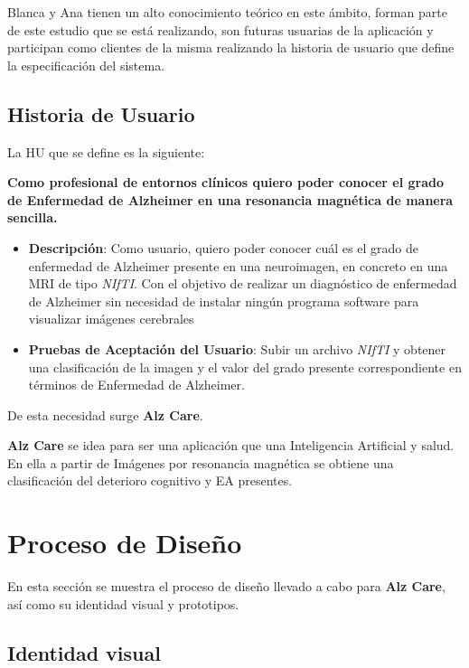 Blanca y Ana tienen un alto conocimiento teórico en este ámbito, forman parte de este estudio que se está realizando,
son futuras usuarias de la aplicación y participan como clientes de la misma realizando la historia de usuario que
define la especificación del sistema.

\subsection{Historia de Usuario}\label{subsec:historia-de-usuario}
La HU que se define es la siguiente:

\textbf{Como profesional de entornos clínicos quiero poder conocer el grado de Enfermedad de Alzheimer en una resonancia
magnética de manera sencilla.}

\begin{itemize}
    \item \textbf{Descripción}: Como usuario, quiero poder conocer cuál es el grado de enfermedad de Alzheimer presente
    en una neuroimagen, en concreto en una MRI de tipo \textit{NIfTI}.
    Con el objetivo de realizar un diagnóstico de enfermedad de Alzheimer sin necesidad de instalar ningún programa
    software para visualizar imágenes cerebrales
    \item \textbf{Pruebas de Aceptación del Usuario}: Subir un archivo \textit{NIfTI} y obtener una clasificación de la
    imagen y el valor del grado presente correspondiente en términos de Enfermedad de Alzheimer.

\end{itemize}

De esta necesidad surge \textbf{Alz Care}.

\textbf{Alz Care} se idea para ser una aplicación que una Inteligencia Artificial y salud.
En ella a partir de Imágenes por resonancia magnética se obtiene una clasificación del deterioro cognitivo y EA presentes.


\section{Proceso de Diseño}\label{sec:proceso-de-diseno}
En esta sección se muestra el proceso de diseño llevado a cabo para \textbf{Alz Care}, así como su identidad visual y
prototipos.

\subsection{Identidad visual}\label{subsec:identidad-visual}

